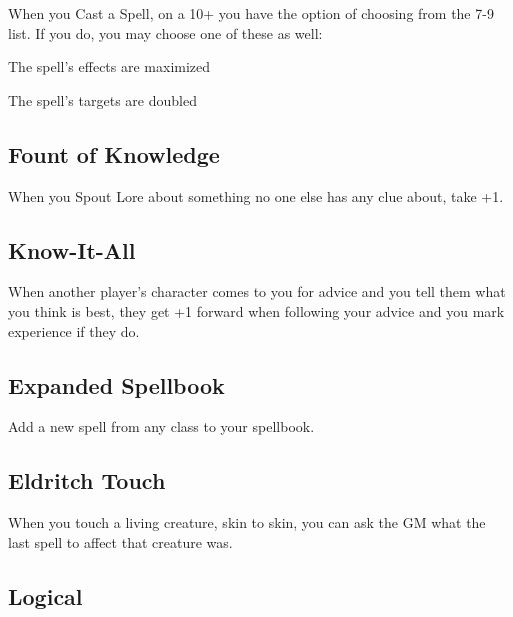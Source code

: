 When you Cast a Spell, on a 10+ you have the option of choosing from the 7-9 list. If you do, you may choose one of these as well:

         
\startitemize[1,packed]
           
\item The spell's effects are maximized

           
\item The spell's targets are doubled

         
\stopitemize
         
\subsection{Fount of Knowledge}    
         

When you Spout Lore about something no one else has any clue about, take +1.

         
\subsection{Know-It-All}   
         

When another player's character comes to you for advice and you tell them what you think is best, they get +1 forward when following your advice and you mark experience if they do.

         
\subsection{Expanded Spellbook}    
         

Add a new spell from any class to your spellbook.

         
\subsection{Eldritch Touch}    
         

When you touch a living creature, skin to skin, you can ask the GM what the last spell to affect that creature was.

         
\subsection{Logical}   
         


